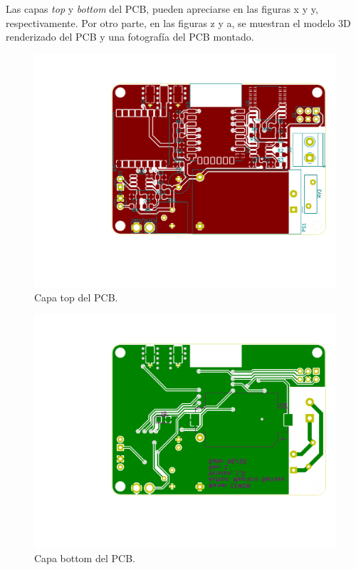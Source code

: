 Las capas \textit{top} y \textit{bottom} del PCB, pueden apreciarse en las figuras x y y, respectivamente. Por otro parte, en las figuras z y a, se muestran el modelo 3D renderizado del PCB y una fotografía del PCB montado.

\begin{figure}[h]
	\centering
	\includegraphics[scale=0.6]{./Figures/pcb_top.pdf}
	\caption{Capa top del PCB.}
		\label{fig:cuadradoAzul}
\end{figure}

\begin{figure}[h]
	\centering
	\includegraphics[scale=0.6]{./Figures/pcb_bot.pdf}
	\caption{Capa bottom del PCB.}
		\label{fig:cuadradoAzul}
\end{figure}

